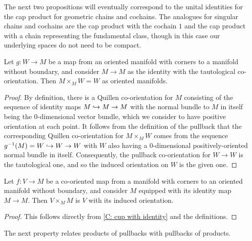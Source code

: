 The next two propositions will eventually correspond to the unital identities for the cap product for geometric chains and cochains.
The analogues for singular chains and cochains are the cap product with the cochain $1$ and the cap product with a chain representing the fundamental class, though in this case our underlying spaces do not need to be compact.

\begin{proposition}\label{P: cap with 1}
	Let $g \colon W \to M$ be a map from an oriented manifold with corners to a manifold without boundary, and consider $M \to M$ as the identity with the tautological co-orientation.
	Then $M \times_M W = W$ as oriented manifolds.
\end{proposition}
\begin{proof}
	By definition, there is a Quillen co-orientation for $M$ consisting of the sequence of identity maps $M \hookrightarrow M \to M$ with the normal bundle to $M$ in itself being the $0$-dimensional vector bundle, which we consider to have positive orientation at each point.
	It follows from the definition of the pullback that the corresponding Quillen co-orientation for $M \times_M W$ comes from the sequence $g^{-1}(M) = W \hookrightarrow W \to W$ with $W$ also having a $0$-dimensional positively-oriented normal bundle in itself.
	Consequently, the pullback co-orientation for $W \to W$ is the tautological one, and so the induced orientation on $W$ is the given one.
\end{proof}

\begin{proposition}\label{P: cap with identity M}
	Let $f \colon V \to M$ be a co-oriented map from a manifold with corners to an oriented manifold without boundary, and consider $M$ equipped with its identity map $M \to M$.
	Then $V \times_M M$ is $V$ with its induced orientation.
\end{proposition}
\begin{proof}
	This follows directly from \cref{C: cup with identity} and the definitions.
\end{proof}

The next property relates products of pullbacks with pullbacks of products.

